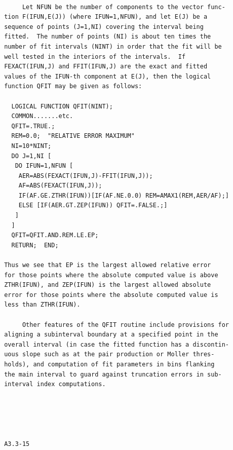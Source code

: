 \newpage {} \begin{verbatim}
 
      Let NFUN be the number of components to the vector func-
 tion F(IFUN,E(J)) (where IFUN=1,NFUN), and let E(J) be a
 sequence of points (J=1,NI) covering the interval being
 fitted.  The number of points (NI) is about ten times the
 number of fit intervals (NINT) in order that the fit will be
 well tested in the interiors of the intervals.  If
 FEXACT(IFUN,J) and FFIT(IFUN,J) are the exact and fitted
 values of the IFUN-th component at E(J), then the logical
 function QFIT may be given as follows:
 
   LOGICAL FUNCTION QFIT(NINT);
   COMMON.......etc.
   QFIT=.TRUE.;
   REM=0.0;  "RELATIVE ERROR MAXIMUM"
   NI=10*NINT;
   DO J=1,NI [
    DO IFUN=1,NFUN [
     AER=ABS(FEXACT(IFUN,J)-FFIT(IFUN,J));
     AF=ABS(FEXACT(IFUN,J));
     IF(AF.GE.ZTHR(IFUN))[IF(AF.NE.0.0) REM=AMAX1(REM,AER/AF);]
     ELSE [IF(AER.GT.ZEP(IFUN)) QFIT=.FALSE.;]
    ]
   ]
   QFIT=QFIT.AND.REM.LE.EP;
   RETURN;  END;
 
 Thus we see that EP is the largest allowed relative error
 for those points where the absolute computed value is above
 ZTHR(IFUN), and ZEP(IFUN) is the largest allowed absolute
 error for those points where the absolute computed value is
 less than ZTHR(IFUN).
 
      Other features of the QFIT routine include provisions for
 aligning a subinterval boundary at a specified point in the
 overall interval (in case the fitted function has a discontin-
 uous slope such as at the pair production or Moller thres-
 holds), and computation of fit parameters in bins flanking
 the main interval to guard against truncation errors in sub-
 interval index computations.
 
 
 
 
 
 A3.3-15  
\end{verbatim} 
